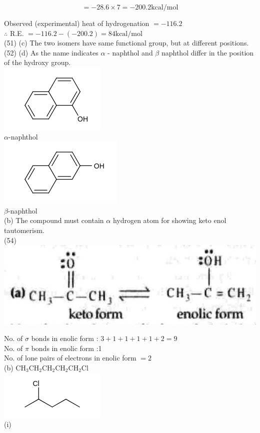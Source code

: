 \documentclass[10pt]{article}
\begin{document}
$$
=-28.6 \times 7=-200.2 \mathrm{kcal} / \mathrm{mol}
$$

Observed (experimental) heat of hydrogenation $=-116.2$\\
$\therefore$ R.E. $=-116.2-(-200.2)=84 \mathrm{kcal} / \mathrm{mol}$\\
(51) (c) The two isomers have same functional group, but at different positions.\\
(52) (d) As the name indicates $\alpha$ - naphthol and $\beta$ naphthol differ in the position of the hydroxy group.\\
\includegraphics{smile-55ca87b00945606a5073f6f18c39172ea494803d}\\
$\alpha$-naphthol\\
\includegraphics{smile-bf7228a38d7d72f9c8491bc725c771d191d92487}\\
$\beta$-naphthol\\
(b) The compound must contain $\alpha$ hydrogen atom for showing keto enol tautomerism.\\
(54)\\
\includegraphics[max width=\textwidth, center]{2025_01_28_8470952b98110cec3aabg-159(2)}

No. of $\sigma$ bonds in enolic form : $3+1+1+1+1+2=9$\\
No. of $\pi$ bonds in enolic form :1\\
No. of lone pairs of electrons in enolic form $=2$\\
(b) $\mathrm{CH}_{3} \mathrm{CH}_{2} \mathrm{CH}_{2} \mathrm{CH}_{2} \mathrm{CH}_{2} \mathrm{Cl}$\\
\includegraphics{smile-5d818bd762a220043042ca038999115388e83142}\\
(i)
\end{document}
